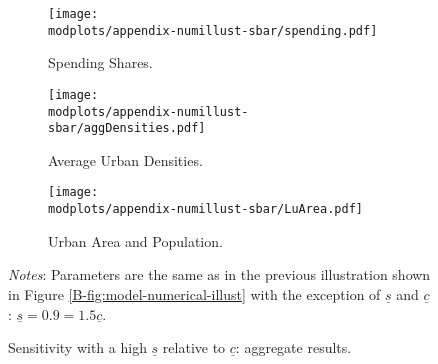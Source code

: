 \documentclass[11pt]{report}
\newcommand{\round}{revision3}  %
\newcommand{\modplots}{../../output/model/plots/\round}
\newcommand{\pthree}{0.37}  %
\newcommand{\parboxadjust}{1.1}
\begin{document}
\begin{figure}[h]
	\begin{adjustbox}{center}
		\parbox{\parboxadjust\textwidth}{\lineskip=0pt
			\begin{subfigure}{\pthree\textwidth}
				\texttt{[image: \\modplots/appendix-numillust-sbar/spending.pdf]}
				\caption{Spending Shares.\label{B-fig:model-numerical-illust-spending-sbar}}
			\end{subfigure}%
			\begin{subfigure}{\pthree\textwidth}
				\texttt{[image: \\modplots/appendix-numillust-sbar/aggDensities.pdf]}
				\caption{Average Urban Densities.\label{B-fig:model-numerical-illust-density-sbar}}
			\end{subfigure}%
			\hspace{3mm}
			\begin{subfigure}{\pthree\textwidth}
				\texttt{[image: \\modplots/appendix-numillust-sbar/LuArea.pdf]}
				\caption{Urban Area and Population.\label{B-fig:model-numerical-illust-LuArea-sbar}}
			\end{subfigure}
		}
	\end{adjustbox}
	\caption{Sensitivity with a high $\underline{s}$ relative to $\underline{c}$: aggregate results.\label{B-fig:model-numerical-illust-sbar}}
	{\footnotesize \textit{Notes}: Parameters are the same as in the previous illustration shown in Figure \ref{B-fig:model-numerical-illust} with the exception of $\underline{s}$ and $\underline{c}$: $\underline{s}=0.9=1.5\underline{c}$.}
\end{figure}
\end{document}
